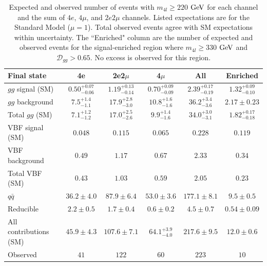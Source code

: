 \begin{table}[htbp]
\begin{center}
\begin{tabular}{l|c|c|c|c|c}
\hline
Final state & 4e  &  2e2$\mu$  & 4$\mu$  & All & Enriched \\
\hline
$gg$ signal (SM) &  $0.50^{+0.07}_{-0.06}$ & $1.19^{+0.13}_{-0.14}$ &  $0.70^{+0.09}_{-0.09}$ &  $2.39^{+0.17}_{-0.19}$ & $1.32^{+0.09}_{-0.10}$ \\
$gg$ background &  $7.5^{+1.4}_{-1.1}$  & $17.9^{+2.8}_{-3.0}$  & $10.8^{+1.6}_{-1.6}$ &  $36.2^{+3.4}_{-3.6}$ & $2.17\pm 0.23$ \\
Total $gg$ (SM) & $7.1^{+1.2}_{-1.2}$ & $17.0^{+2.5}_{-2.6}$ & $9.9^{+1.4}_{-1.6}$ & $34.0^{+3.0}_{-3.1}$ & $1.82^{+0.17}_{-0.18}$ \\
\hline
VBF signal (SM) & $0.048$ & $0.115$ & $0.065$ & $0.228$ & $0.119$ \\                                                                       
VBF background & $0.49$ & $1.17$ & $0.67$ & $2.33$ & $0.34$ \\                                                                             
Total VBF (SM) & $0.43$ & $1.03$ & $0.59$ & $2.05$ & $0.23$ \\
\hline
$q\bar{q}$ & $36.2\pm 4.0$  & $87.9\pm 6.4$  & $53.0\pm 3.6$  & $177.1\pm 8.1$ & $9.5\pm 0.5$  \\
Reducible & $2.2\pm 0.5$ & $1.7\pm 0.4$ & $0.6\pm 0.2$ & $4.5\pm 0.7$ & $0.54\pm 0.09$ \\
\hline
All contributions (SM) & $45.9\pm 4.3$  & $107.6\pm 7.1$ & $64.1^{+3.9}_{-4.0}$  & $217.6\pm 9.5$ & $12.0\pm 0.6$ \\
\hline
Observed  & $41$ & $122$ & $60$ & $223$ & $10$ \\
\hline
\end{tabular}
\caption[Expected and Observed $4l$ Yields in Off-Shell Region]{Expected and observed number of events with $m_{4l}\geq 220$ $\rm{GeV}$ for each channel and the sum of $4e$, $4\mu$, and $2e2\mu$ channels. Listed expectations are for the Standard Model ($\mu=1$). Total observed events agree with SM expectations within uncertainty. The ``Enriched" column are the number of expected and observed events for the signal-enriched region where $m_{4l}\geq 330$ $\rm{GeV}$ and $\mathcal{D}_{gg}>0.65$. No excess is observed for this region.}
\label{tbl:OffShell4lYields}
\end{center}
\end{table}

